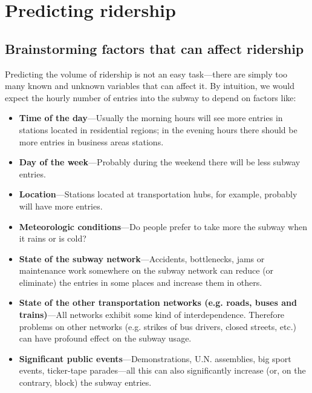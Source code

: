 \documentclass{article}
\begin{document}
\section{Predicting ridership}

\subsection{Brainstorming factors that can affect ridership}


Predicting the volume of ridership is not an easy task---there are simply too many known and unknown variables that can affect it. By intuition, we would expect the hourly number of entries into the subway to depend on factors like:

\begin{itemize}
\item \textbf{Time of the day}---Usually the morning hours will see more entries in stations located in residential regions; in the evening hours there should be more entries in  business areas stations.
\item \textbf{Day of the week}---Probably during the weekend there will be less subway entries.
\item \textbf{Location}---Stations located at transportation hubs, for example, probably will have more entries.
\item \textbf{Meteorologic conditions}---Do people prefer to take more the subway when it rains or is cold?
\item \textbf{State of the subway network}---Accidents, bottlenecks, jams or maintenance work somewhere on the subway network can reduce (or eliminate) the entries in some places and increase them in others.
\item \textbf{State of the other transportation networks (e.g. roads, buses and trains)}---All networks exhibit some kind of interdependence. Therefore problems on other networks (e.g. strikes of bus drivers, closed streets, etc.) can have profound effect on the subway usage.
\item \textbf{Significant public events}---Demonstrations, U.N. assemblies, big sport events, ticker-tape parades---all this can also significantly increase (or, on the contrary, block) the subway entries.
\end{itemize}
\end{document}
